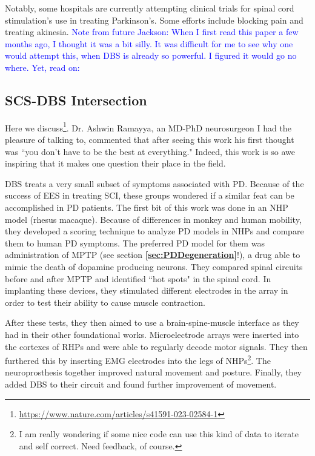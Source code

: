 Notably, some hospitals are currently attempting clinical trials for spinal cord stimulation's use in treating Parkinson's. Some efforts include blocking pain and treating akinesia. \textcolor{blue}{Note from future Jackson: When I first read this paper a few months ago, I thought it was a bit silly. It was difficult for me to see why one would attempt this, when DBS is already so powerful. I figured it would go no where. Yet, read on:}

\subsection{SCS-DBS Intersection}

Here we discuss\footnote{\url{https://www.nature.com/articles/s41591-023-02584-1}}. Dr. Ashwin Ramayya, an MD-PhD neurosurgeon I had the pleasure of talking to, commented that after seeing this work his first thought was ``you don't have to be the best at everything." Indeed, this work is so awe inspiring that it makes one question their place in the field.\newline

DBS treats a very small subset of symptoms associated with PD. Because of the success of EES in treating SCI, these groups wondered if a similar feat can be accomplished in PD patients. The first bit of this work was done in an NHP model (rhesus macaque). Because of differences in monkey and human mobility, they developed a scoring technique to analyze PD models in NHPs and compare them to human PD symptoms. The preferred PD model for them was administration of MPTP (see section \textbf{\ref{sec:PDDegeneration}}!), a drug able to mimic the death of dopamine producing neurons. They compared spinal circuits before and after MPTP and identified ``hot spots" in the spinal cord. In implanting these devices, they stimulated different electrodes in the array in order to test their ability to cause muscle contraction. \newline

After these tests, they then aimed to use a brain-spine-muscle interface as they had in their other foundational works. Microelectrode arrays were inserted into the cortexes of RHPs and were able to regularly decode motor signals. They then furthered this by inserting EMG electrodes into the legs of NHPs\footnote{I am really wondering if some nice code can use this kind of data to iterate and self correct. Need feedback, of course.}. The neuroprosthesis together improved natural movement and posture. Finally, they added DBS to their circuit and found further improvement of movement. \newline

